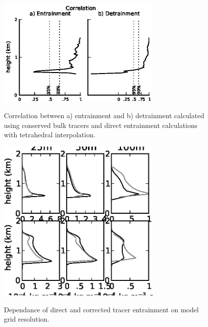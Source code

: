 \documentclass[12pt]{article}
\begin{document}
\begin{figure}[t]
  \noindent\includegraphics[width=19pc,angle=0]{./figures/correlations_core.eps}\\
  \caption{Correlation between a) entrainment and b) detrainment calculated 
using conserved bulk tracers and direct entrainment calculations with 
tetrahedral interpolation.}\label{fig:correlations}
\end{figure}

\begin{figure}[t]
  \noindent\includegraphics[width=19pc,angle=0]{./figures/resolution_dependence_core.eps}\\
  \caption{Dependance of direct and corrected tracer entrainment on model 
grid resolution.}\label{fig:resolution_dependence}
\end{figure}
\end{document}
